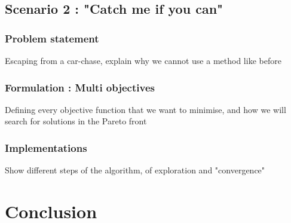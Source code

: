 \documentclass[11pt, oneside]{article}   	%
\begin{document}
	\subsection{Scenario 2 : "Catch me if you can"}
		\subsubsection{Problem statement}
			Escaping from a car-chase, explain why we cannot use a method like before
		\subsubsection{Formulation : Multi objectives}
			Defining every objective function that we want to minimise, and how we will search for solutions in the Pareto front
		\subsubsection{Implementations}
			Show different steps of the algorithm, of exploration and "convergence"
\section*{Conclusion}
			
\end{document}
